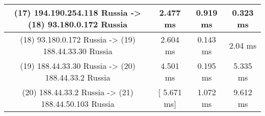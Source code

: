 \begin{table}[]
\begin{tabular}{ | c | c | c | c | }
(17) 194.190.254.118 Russia          -> (18) 93.180.0.172    Russia        & 	     2.477 ms   	 &    0.919 ms   	  &   0.323 ms   \\ \hline
(18) 93.180.0.172    Russia          -> (19) 188.44.33.30    Russia        & 	     2.604 ms   	 &    0.143 ms   	  &    2.04 ms   \\ \hline
(19) 188.44.33.30    Russia          -> (20) 188.44.33.2     Russia        & 	     4.501 ms   	 &    0.195 ms   	  &   5.335 ms   \\ \hline
(20) 188.44.33.2     Russia          -> (21) 188.44.50.103   Russia        & 	  [  5.671 ms]  	 &    1.072 ms   	  &   9.612 ms   \\ \hline

\end{tabular}
\end{table}
